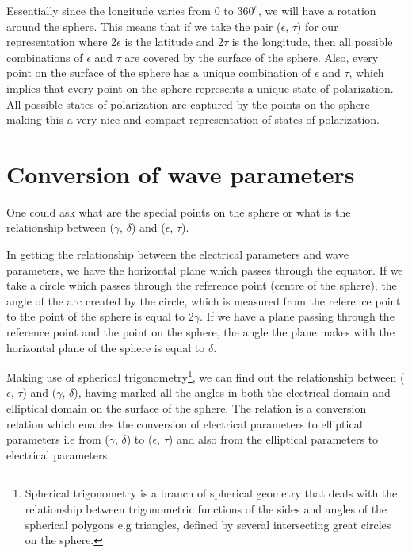 Essentially since the longitude varies from 0 to $360^{o}$, we will have a rotation around the sphere. This means that if we take the pair ($\epsilon$, $\tau$) for our representation where  2$\epsilon$ is the latitude and 2$\tau$ is the longitude, then all possible combinations of $\epsilon$ and $\tau$ are covered by the surface of the sphere.	Also, every point on the surface of the sphere has a unique combination of $\epsilon$ and $\tau$, which implies that every point on the sphere represents a unique state of polarization. All possible states of polarization are captured by the points on the sphere making this a very nice and compact representation of states of polarization.


\section{Conversion of wave parameters}
One could ask what are the special points on the sphere or what is the relationship between ($\gamma$, $\delta$) and ($\epsilon$, $\tau$).  

In getting the relationship between the electrical parameters and wave parameters, we have the horizontal plane which passes through the equator.
If we take a circle which passes through the reference point (centre of the sphere), the angle of the arc created by the circle, which is measured from the reference point to the point of the sphere is equal to 2$\gamma$.
If we have a plane passing through the reference point and the point on the sphere, the angle the plane makes with the horizontal plane of the sphere is equal to $\delta$.

Making use of spherical trigonometry\footnote{Spherical trigonometry is a branch of spherical geometry that deals with the relationship between trigonometric functions of the sides and angles of the spherical polygons e.g triangles, defined by several intersecting great circles on the sphere.}, we can find out the relationship between ($\epsilon$, $\tau$) and ($\gamma$, $\delta$), having marked all the angles in both the electrical domain and elliptical domain on the surface of the sphere. The relation is a conversion relation which enables the conversion of electrical parameters to elliptical parameters i.e from ($\gamma$, $\delta$) to ($\epsilon$, $\tau$) and also from the elliptical parameters to electrical parameters.

